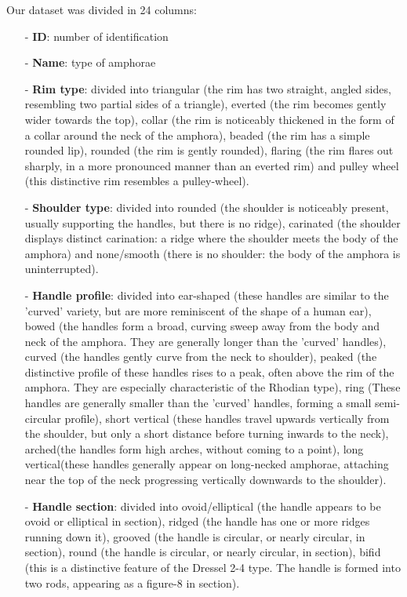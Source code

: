 \documentclass[10pt,a4paper]{article}
\begin{document}
Our dataset was divided in 24 columns:

\begin{itemize}
\item[-] \textbf{ID}: number of identification

\item[-] \textbf{Name}: type of amphorae 

\item[-] \textbf{Rim type}: divided into triangular (the rim has two straight, angled sides, resembling two partial sides of a triangle), everted (the rim becomes gently wider towards the top), collar (the rim is noticeably thickened in the form of a collar around the neck of the amphora), beaded (the rim has a simple rounded lip), rounded (the rim is gently rounded), flaring (the rim flares out sharply, in a more pronounced manner than an everted rim) and pulley wheel (this distinctive rim resembles a pulley-wheel). 

\item[-] \textbf{Shoulder type}: divided into rounded (the shoulder is noticeably present, usually supporting the handles, but there is no ridge), carinated (the shoulder displays distinct carination: a ridge where the shoulder meets the body of the amphora) and none/smooth (there is no shoulder: the body of the amphora is uninterrupted).

\item[-] \textbf{Handle profile}: divided into ear-shaped (these handles are similar to the 'curved' variety, but are more reminiscent of the shape of a human ear), bowed (the handles form a broad, curving sweep away from the body and neck of the amphora. They are generally longer than the 'curved' handles), curved (the handles gently curve from the neck to shoulder), peaked (the distinctive profile of these handles rises to a peak, often above the rim of the amphora. They are especially characteristic of the Rhodian type), ring (These handles are generally smaller than the 'curved' handles, forming a small semi-circular profile), short vertical (these handles travel upwards vertically from the shoulder, but only a short distance before turning inwards to the neck), arched(the handles form high arches, without coming to a point), long vertical(these handles generally appear on long-necked amphorae, attaching near the top of the neck progressing vertically downwards to the shoulder).

\item[-] \textbf{Handle section}: divided into ovoid/elliptical (the handle appears to be ovoid or elliptical in section), ridged (the handle has one or more ridges running down it), grooved (the handle is circular, or nearly circular, in section), round (the handle is circular, or nearly circular, in section), bifid (this is a distinctive feature of the Dressel 2-4 type. The handle is formed into two rods, appearing as a figure-8 in section).


\end{itemize}
\end{document}
